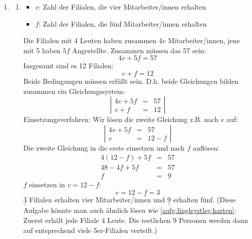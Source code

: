 \documentclass[%
11pt,%
twoside,%
titlepage,%
german,%
]{scrartcl}
\newcommand{\result}[1]{\underline{\underline{#1}}}
\begin{document}
\begin{enumerate}
\item
  \begin{enumerate}
  \item 
    \begin{itemize}
    \item $v$: Zahl der Filialen, die vier Mitarbeiter/innen erhalten
    \item $f$: Zahl der Filialen, die f\"unf Mitarbeiter/innen erhalten
    \end{itemize}
    Die Filialen mit 4 Leuten haben zusammen $4v$ Mitarbeiter/innen, jene mit 5 haben $5f$ Angestellte. Zusammen m\"ussen das 57 sein:
    \begin{displaymath}
      4v+5f = 57
    \end{displaymath}
    Insgesamt sind es 12 Filialen:
    \begin{displaymath}
      v+f = 12
    \end{displaymath}
    Beide Bedingungen m\"ussen erf\"ullt sein. D.h. beide Gleichungen bilden zusammen ein Gleichungssystem:
    \begin{displaymath}
      \left| 
        \begin{array}{rcl}
          4v+5f & = & 57 \\
          v+f & = & 12
        \end{array} \right|
    \end{displaymath}
    Einsetzungsverfahren: Wir l\"osen die zweite Gleichung z.B. nach $v$ auf:
    \begin{displaymath}
      \left| 
        \begin{array}{rcl}
          4v+5f & = & 57 \\
          v & = & 12-f
        \end{array} \right|
    \end{displaymath}
    Die zweite Gleichung in die erste einsetzen und nach $f$ aufl\"osen:
    \begin{eqnarray*}
      4(12-f) + 5f & = & 57 \\
      48-4f + 5f & = & 57 \\
      f & = & 9
    \end{eqnarray*}
    $f$ einsetzen in $v=12-f$:
    \begin{displaymath}
      v = 12-f = 3
    \end{displaymath}
    $\result{3}$ Filialen erhalten vier Mitarbeiter/innen und $\result{9}$ erhalten f\"unf. (Diese Aufgabe k\"onnte man auch \"ahnlich l\"osen wie \ref{aufg:linglsystlsg:karten}: Zuerst erh\"alt jede Filiale 4 Leute. Die restlichen 9 Personen werden dann auf entsprechend viele 5er-Filialen verteilt.)


\end{enumerate}
\end{enumerate}
\end{document}
